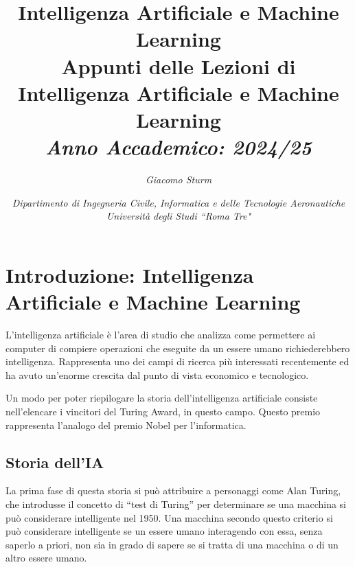\documentclass{article}
\numberwithin{equation}{subsection}
\begin{document}
\title{%
    \textbf{Intelligenza Artificiale e Machine Learning}  \\ 
    \large Appunti delle Lezioni di Intelligenza Artificiale e Machine Learning \\
    \textit{Anno Accademico: 2024/25}}
\author{\textit{Giacomo Sturm}}
\date{\textit{Dipartimento di Ingegneria Civile, Informatica e delle Tecnologie Aeronautiche \\
Università degli Studi ``Roma Tre"}}

\maketitle
\thispagestyle{link}

\clearpage


\pagestyle{fancy}
\fancyhead{}\fancyfoot{}
\fancyfoot[C]{\thepage}

\tableofcontents

\clearpage
{}

\section{Introduzione: Intelligenza Artificiale e Machine Learning}

L'intelligenza artificiale è l'area di studio che analizza come permettere ai computer di 
compiere operazioni che eseguite da un essere umano richiederebbero intelligenza. 
Rappresenta uno dei campi di ricerca più interessati recentemente ed ha avuto un'enorme 
crescita dal punto di vista economico e tecnologico. 

Un modo per poter riepilogare la storia dell'intelligenza artificiale consiste nell'elencare 
i vincitori del Turing Award, in questo campo. Questo premio rappresenta l'analogo del 
premio Nobel per l'informatica. 

\subsection{Storia dell'IA}

La prima fase di questa storia si può attribuire a personaggi come Alan Turing, che introdusse 
il concetto di ``test di Turing'' per determinare se una macchina si può considerare 
intelligente nel 1950. Una macchina secondo questo criterio si può considerare intelligente se 
un essere umano interagendo con essa, senza saperlo a priori, non sia in grado di sapere 
se si tratta di una macchina o di un altro essere umano. 
\end{document}
